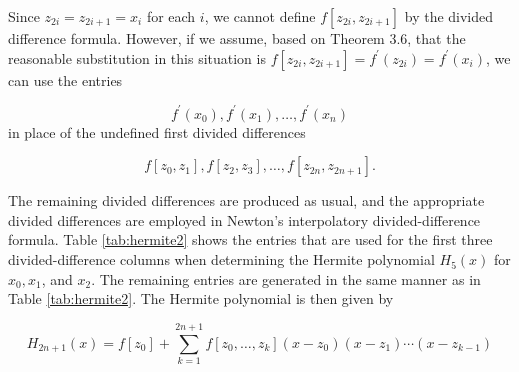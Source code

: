 Since $z_{2 i}=z_{2 i+1}=x_{i}$ for each $i$, we cannot define $f\left[z_{2 i}, z_{2 i+1}\right]$ by the divided difference formula. However, if we assume, based on Theorem 3.6, that the reasonable substitution in this situation is $f\left[z_{2 i}, z_{2 i+1}\right]=f^{\prime}\left(z_{2 i}\right)=f^{\prime}\left(x_{i}\right)$, we can use the entries

$$
f^{\prime}\left(x_{0}\right), f^{\prime}\left(x_{1}\right), \ldots, f^{\prime}\left(x_{n}\right)
$$
in place of the undefined first divided differences

$$
f\left[z_{0}, z_{1}\right], f\left[z_{2}, z_{3}\right], \ldots, f\left[z_{2 n}, z_{2 n+1}\right] .
$$

The remaining divided differences are produced as usual, and the appropriate divided differences are employed in Newton's interpolatory divided-difference formula. Table \ref{tab:hermite2} shows the entries that are used for the first three divided-difference columns when determining the Hermite polynomial $H_{5}(x)$ for $x_{0}, x_{1}$, and $x_{2}$. The remaining entries are generated in the same manner as in Table \ref{tab:hermite2}. The Hermite polynomial is then given by

$$
H_{2 n+1}(x)=f\left[z_{0}\right]+\sum_{k=1}^{2 n+1} f\left[z_{0}, \ldots, z_{k}\right]\left(x-z_{0}\right)\left(x-z_{1}\right) \cdots\left(x-z_{k-1}\right)
$$

%

